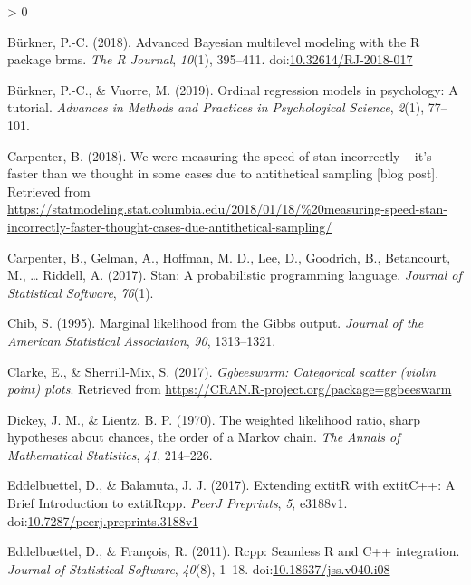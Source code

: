 \documentclass[
  english,
  doc,floatsintext]{apa6}
\newlength{\cslhangindent}
\newenvironment{CSLReferences}[2] %
 {%
  \setlength{\parindent}{0pt}
  \ifodd #1 \everypar{\setlength{\hangindent}{\cslhangindent}}\ignorespaces\fi
  \ifnum #2 > 0
  \setlength{\parskip}{#2\baselineskip}
  \fi
 }%
 {}
\begin{document}
\begin{CSLReferences}{1}{0}
\leavevmode\hypertarget{ref-R-brms_b}{}%
Bürkner, P.-C. (2018). Advanced {Bayesian} multilevel modeling with the {R} package {brms}. \emph{The R Journal}, \emph{10}(1), 395--411. doi:\href{https://doi.org/10.32614/RJ-2018-017}{10.32614/RJ-2018-017}

\leavevmode\hypertarget{ref-burkner2019ordinal}{}%
Bürkner, P.-C., \& Vuorre, M. (2019). Ordinal regression models in psychology: A tutorial. \emph{Advances in Methods and Practices in Psychological Science}, \emph{2}(1), 77--101.

\leavevmode\hypertarget{ref-neff2018}{}%
Carpenter, B. (2018). We were measuring the speed of stan incorrectly -- it's faster than we thought in some cases due to antithetical sampling {[}blog post{]}. Retrieved from \url{https://statmodeling.stat.columbia.edu/2018/01/18/\%20measuring-speed-stan-incorrectly-faster-thought-cases-due-antithetical-sampling/}

\leavevmode\hypertarget{ref-carpenter2017stan}{}%
Carpenter, B., Gelman, A., Hoffman, M. D., Lee, D., Goodrich, B., Betancourt, M., \ldots{} Riddell, A. (2017). Stan: A probabilistic programming language. \emph{Journal of Statistical Software}, \emph{76}(1).

\leavevmode\hypertarget{ref-chib1995marginal}{}%
Chib, S. (1995). Marginal likelihood from the {Gibbs} output. \emph{Journal of the American Statistical Association}, \emph{90}, 1313--1321.

\leavevmode\hypertarget{ref-R-ggbeeswarm}{}%
Clarke, E., \& Sherrill-Mix, S. (2017). \emph{Ggbeeswarm: Categorical scatter (violin point) plots}. Retrieved from \url{https://CRAN.R-project.org/package=ggbeeswarm}

\leavevmode\hypertarget{ref-dickey1970weighted}{}%
Dickey, J. M., \& Lientz, B. P. (1970). The weighted likelihood ratio, sharp hypotheses about chances, the order of a {Markov} chain. \emph{The Annals of Mathematical Statistics}, \emph{41}, 214--226.

\leavevmode\hypertarget{ref-R-Rcpp_b}{}%
Eddelbuettel, D., \& Balamuta, J. J. (2017). {Extending extit{R} with extit{C++}: A Brief Introduction to extit{Rcpp}}. \emph{PeerJ Preprints}, \emph{5}, e3188v1. doi:\href{https://doi.org/10.7287/peerj.preprints.3188v1}{10.7287/peerj.preprints.3188v1}

\leavevmode\hypertarget{ref-R-Rcpp_a}{}%
Eddelbuettel, D., \& François, R. (2011). {Rcpp}: Seamless {R} and {C++} integration. \emph{Journal of Statistical Software}, \emph{40}(8), 1--18. doi:\href{https://doi.org/10.18637/jss.v040.i08}{10.18637/jss.v040.i08}


\end{CSLReferences}
\end{document}
